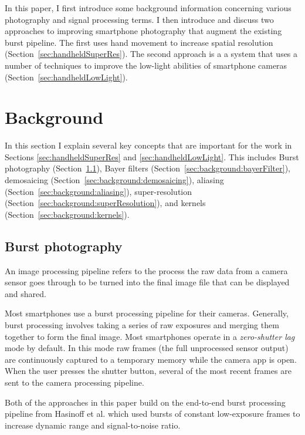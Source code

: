 \documentclass{sig-alternate}
\begin{document}
In this paper, I first introduce some background information concerning various photography and signal processing terms. I then introduce and discuss two approaches to improving smartphone photography that augment the existing burst pipeline. The first uses hand movement to increase spatial resolution (Section~\ref{sec:handheldSuperRes}). The second approach is a a system that uses a number of techniques to improve the low-light abilities of smartphone cameras (Section~\ref{sec:handheldLowLight}).

\section{Background}
\label{sec:background}

In this section I explain several key concepts that are important for the work in Sections \ref{sec:handheldSuperRes} and \ref{sec:handheldLowLight}. This includes Burst photography (Section~\ref{sec:background:burstPhotography}), Bayer filters (Section~\ref{sec:background:bayerFilter}), demosaicing (Section~\ref{sec:background:demosaicing}), aliasing (Section~\ref{sec:background:aliasing}), super-resolution (Section~\ref{sec:background:superResolution}), and kernels (Section~\ref{sec:background:kernels}).

\subsection{Burst photography}
\label{sec:background:burstPhotography}

An image processing pipeline refers to the process the raw data from a camera sensor goes through to be turned into the final image file that can be displayed and shared. 

Most smartphones use a burst processing pipeline for their cameras. Generally, burst processing involves taking a series of raw exposures and merging them together to form the final image. Most smartphones operate in a \emph{zero-shutter lag} mode by default. In this mode raw frames (the full unprocessed sensor output) are continuously captured to a temporary memory while the camera app is open. When the user presses the shutter button, several of the most recent frames are sent to the camera processing pipeline.

Both of the approaches in this paper build on the end-to-end burst processing pipeline from Hasinoff et al. \cite{Hasinoff2016} which used bursts of constant low-exposure frames to increase dynamic range and signal-to-noise ratio.
\end{document}

